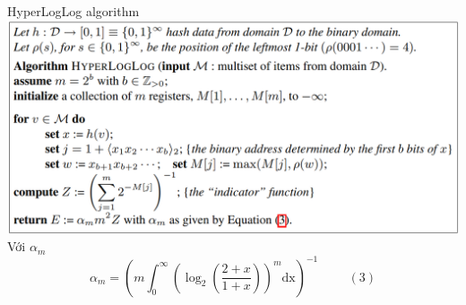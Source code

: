 \documentclass[10pt]{beamer}
\begin{document}
  
\begin{frame}{HyperLogLog algorithm}
  \includegraphics[scale=.5]{raw_hll.png}
  \indent Với $\alpha_m$
  \[
      \alpha_m = \left(m\int_0^\infty\left(\log_2\left(\frac{2+x}{1+x}\right)\right)^m\text{dx}\right)^{-1} \hspace{1cm}(3)  
  \]
\end{frame}
\end{document}
